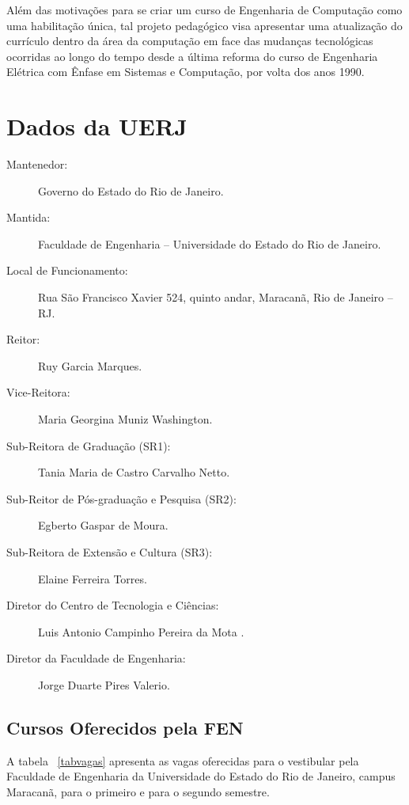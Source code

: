 Além das motivações para se criar um curso de Engenharia de Computação como uma habilitação única, tal projeto pedagógico visa apresentar uma atualização do currículo dentro da área da computação em face das mudanças tecnológicas ocorridas ao longo do tempo desde a última reforma do curso de Engenharia Elétrica com Ênfase em Sistemas e Computação, por volta dos anos 1990.


\chapter{Dados da UERJ}

\begin{description}
\item[Mantenedor:] Governo do Estado do Rio de Janeiro.
\item [Mantida:] Faculdade de Engenharia – Universidade do Estado do Rio de Janeiro.
\item [Local de Funcionamento:] Rua São Francisco Xavier 524, quinto andar, Maracanã, Rio de Janeiro – RJ.
\item [Reitor:] Ruy Garcia Marques.
\item [Vice-Reitora:] Maria Georgina Muniz Washington.
\item [Sub-Reitora de Graduação (SR1):] Tania Maria de Castro Carvalho Netto.
\item [Sub-Reitor de Pós-graduação e Pesquisa (SR2):] Egberto Gaspar de Moura.
\item [Sub-Reitora de Extensão e Cultura (SR3):] Elaine Ferreira Torres.
\item [Diretor do Centro de Tecnologia e Ciências:] Luis Antonio Campinho Pereira da Mota .
\item [Diretor da Faculdade de Engenharia:] Jorge Duarte Pires Valerio.
\end{description}


\section{Cursos Oferecidos pela FEN}
A tabela  ~\ref{tabvagas} apresenta as vagas oferecidas para o vestibular pela Faculdade de Engenharia da Universidade do Estado do Rio de Janeiro, campus Maracanã, para o primeiro e para o segundo semestre.
\label{sec:cursosoferecidos}

